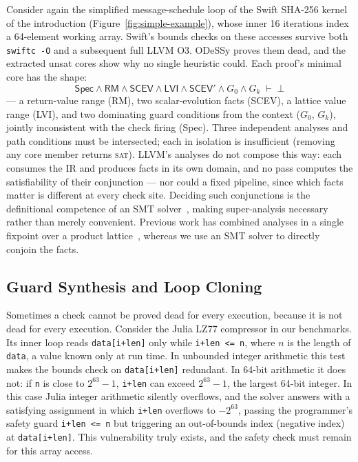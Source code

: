 \documentclass[acmsmall,screen,nonacm]{acmart}
\newcommand{\odessy}{ODeSSy}
\newcommand{\tool}{\odessy}
\begin{document}
Consider again the simplified message-schedule loop of the Swift SHA-256
kernel of the introduction (Figure~\ref{fig:simple-example}), whose inner
16 iterations index a 64-element working array. Swift's bounds checks on
these accesses survive both \texttt{swiftc -O} and a subsequent full LLVM
O3. \tool{} proves them dead, and the extracted unsat cores show why no
single heuristic could. Each proof's minimal core has the shape:
\[
\textsf{Spec} \wedge \textsf{RM} \wedge \textsf{SCEV} \wedge \textsf{LVI}
\wedge \textsf{SCEV}' \wedge G_0 \wedge G_k \;\vdash\; \bot
\]
--- a return-value range (\textsf{RM}), two scalar-evolution facts
(\textsf{SCEV}), a lattice value range (\textsf{LVI}), and two dominating
guard conditions from the context ($G_0$, $G_k$), jointly inconsistent with the check
firing (\textsf{Spec}). Three independent analyses and path conditions must be intersected;
each in isolation is insufficient (removing any core member returns
\textsc{sat}). LLVM's analyses do not compose this way: each consumes the
IR and produces facts in its own domain, and no pass computes the
satisfiability of their conjunction --- nor could a fixed pipeline, since
which facts matter is different at every check site. Deciding such
conjunctions is the definitional competence of an SMT
solver~\cite{demoura2008z3}, making super-analysis necessary rather than merely convenient. Previous work has combined analyses in a single fixpoint over a product lattice~\cite{click1995combining, lerner2002composing}, whereas we use an SMT solver to directly conjoin the facts.

\subsection{Guard Synthesis and Loop Cloning}
\label{sec:guards}
Sometimes a check cannot be proved dead for every execution, because it
is not dead for every execution. Consider the Julia LZ77 compressor in our benchmarks. Its inner loop reads
\texttt{data[i+len]} only while \texttt{i+len <= n}, where $n$ is the
length of \texttt{data}, a value known only at run time. In
unbounded integer arithmetic this test makes the bounds check on
\texttt{data[i+len]} redundant. In 64-bit arithmetic it does not: if \texttt{n} is close to $2^{63}-1$, \texttt{i+len} can exceed $2^{63}-1$, the largest 64-bit integer. In this case Julia
integer arithmetic silently overflows, and the solver answers with a satisfying assignment in which \texttt{i+len} overflows to $-2^{63}$, passing the programmer's safety guard \texttt{i+len <= n} but triggering an out-of-bounds index (negative index) at \texttt{data[i+len]}. This vulnerability truly exists, and the safety check must remain for this array access.
\end{document}
